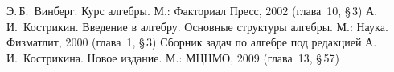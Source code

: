 \documentclass[a4paper,10pt]{amsart}
\theoremstyle{definition}
\theoremstyle{remark}
\begin{document}
\bigskip

\begin{thebibliography}{99}
Э.\,Б.~Винберг. Курс алгебры. М.: Факториал Пресс, 2002 (глава~10,
\S\,3)
А.\,И.~Кострикин. Введение в алгебру. Основные структуры алгебры.
М.: Наука. Физматлит, 2000 (глава~1, \S\,3)
Сборник задач по алгебре под редакцией А.\,И.~Кострикина. Новое
издание. М.: МЦНМО, 2009 (глава~13, \S\,57)
\end{thebibliography}
\end{document}
